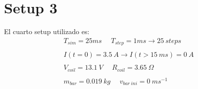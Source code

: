 \documentclass{article}
\begin{document}
\section{Setup 3}
El cuarto setup utilizado es:
\begin{align*}
    T_{sim}=25ms~~~~~~T_{step}=1ms\to25~steps
    \\~\\
    I(t=0)=3.5~A\to I(t>15~ms)=0~A
    \\~\\
    V_{coil}=13.1~V~~~~~~R_{coil}=3.65~\Omega
    \\~\\
    m_{bar}=0.019~kg~~~~~~v_{bar~ini}=0~ms^{-1}
\end{align*}
\end{document}
